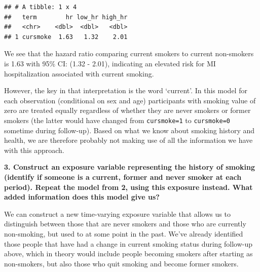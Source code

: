 \documentclass[
]{book}
\newenvironment{Shaded}{\begin{snugshade}}{\end{snugshade}}
\newcommand{\DataTypeTok}[1]{\textcolor[rgb]{0.13,0.29,0.53}{#1}}
\newcommand{\FloatTok}[1]{\textcolor[rgb]{0.00,0.00,0.81}{#1}}
\newcommand{\KeywordTok}[1]{\textcolor[rgb]{0.13,0.29,0.53}{\textbf{#1}}}
\newcommand{\NormalTok}[1]{#1}
\newcommand{\OperatorTok}[1]{\textcolor[rgb]{0.81,0.36,0.00}{\textbf{#1}}}
\newcommand{\StringTok}[1]{\textcolor[rgb]{0.31,0.60,0.02}{#1}}
\begin{document}
\begin{Shaded}
\end{Shaded}

\begin{verbatim}
## # A tibble: 1 x 4
##   term        hr low_hr high_hr
##   <chr>    <dbl>  <dbl>   <dbl>
## 1 cursmoke  1.63   1.32    2.01
\end{verbatim}

We see that the hazard ratio comparing current smokers to current non-smokers is 1.63 with 95\% CI: (1.32 - 2.01), indicating an elevated risk for MI hospitalization associated with current smoking.

However, the key in that interpretation is the word `current'. In this model for each observation (conditional on sex and age) participants with smoking value of zero are treated equally regardless of whether they are never smokers or former smokers (the latter would have changed from \texttt{cursmoke=1} to \texttt{cursmoke=0} sometime during follow-up). Based on what we know about smoking history and health, we are therefore probably not making use of all the information we have with this approach.

\textbf{3. Construct an exposure variable representing the history of smoking (identify if someone is a current, former and never smoker at each period). Repeat the model from 2, using this exposure instead. What added information does this model give us?}

We can construct a new time-varying exposure variable that allows us to distinguish between those that are never smokers and those who are currently non-smoking, but used to at some point in the past. We've already identified those people that have had a change in current smoking status during follow-up above, which in theory would include people becoming smokers after starting as non-smokers, but also those who quit smoking and become former smokers.
\end{document}
